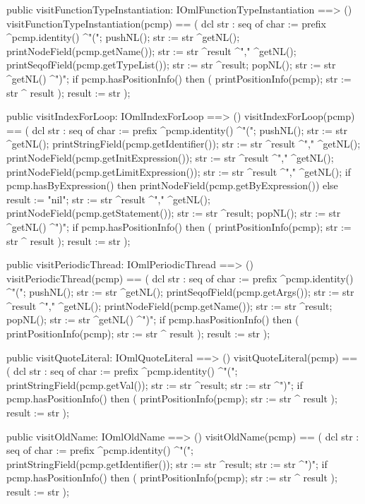 \begin{vdm_al}
  public visitFunctionTypeInstantiation: IOmlFunctionTypeInstantiation ==> ()
  visitFunctionTypeInstantiation(pcmp) ==
    ( dcl str : seq of char := prefix ^pcmp.identity() ^"(";
      pushNL();
      str := str ^getNL();
      printNodeField(pcmp.getName());
      str := str ^result ^"," ^getNL();
      printSeqofField(pcmp.getTypeList());
      str := str ^result;
      popNL();
      str := str ^getNL() ^")";
      if pcmp.hasPositionInfo()
      then ( printPositionInfo(pcmp);
             str := str ^ result );
      result := str );

  public visitIndexForLoop: IOmlIndexForLoop ==> ()
  visitIndexForLoop(pcmp) ==
    ( dcl str : seq of char := prefix ^pcmp.identity() ^"(";
      pushNL();
      str := str ^getNL();
      printStringField(pcmp.getIdentifier());
      str := str ^result ^"," ^getNL();
      printNodeField(pcmp.getInitExpression());
      str := str ^result ^"," ^getNL();
      printNodeField(pcmp.getLimitExpression());
      str := str ^result ^"," ^getNL();
      if pcmp.hasByExpression()
      then printNodeField(pcmp.getByExpression())
      else result := "nil";
      str := str ^result ^"," ^getNL();
      printNodeField(pcmp.getStatement());
      str := str ^result;
      popNL();
      str := str ^getNL() ^")";
      if pcmp.hasPositionInfo()
      then ( printPositionInfo(pcmp);
             str := str ^ result );
      result := str );

  public visitPeriodicThread: IOmlPeriodicThread ==> ()
  visitPeriodicThread(pcmp) ==
    ( dcl str : seq of char := prefix ^pcmp.identity() ^"(";
      pushNL();
      str := str ^getNL();
      printSeqofField(pcmp.getArgs());
      str := str ^result ^"," ^getNL();
      printNodeField(pcmp.getName());
      str := str ^result;
      popNL();
      str := str ^getNL() ^")";
      if pcmp.hasPositionInfo()
      then ( printPositionInfo(pcmp);
             str := str ^ result );
      result := str );

  public visitQuoteLiteral: IOmlQuoteLiteral ==> ()
  visitQuoteLiteral(pcmp) ==
    ( dcl str : seq of char := prefix ^pcmp.identity() ^"(";
      printStringField(pcmp.getVal());
      str := str ^result;
      str := str ^")";
      if pcmp.hasPositionInfo()
      then ( printPositionInfo(pcmp);
             str := str ^ result );
      result := str );

  public visitOldName: IOmlOldName ==> ()
  visitOldName(pcmp) ==
    ( dcl str : seq of char := prefix ^pcmp.identity() ^"(";
      printStringField(pcmp.getIdentifier());
      str := str ^result;
      str := str ^")";
      if pcmp.hasPositionInfo()
      then ( printPositionInfo(pcmp);
             str := str ^ result );
      result := str );


\end{vdm_al}
